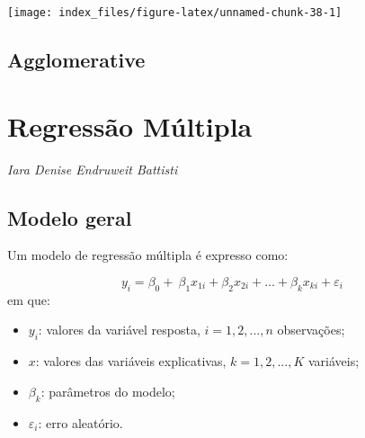 \documentclass[12pt,brazil,oneside]{book}
\newenvironment{Shaded}{\begin{snugshade}}{\end{snugshade}}
\newcommand{\CommentTok}[1]{\textcolor[rgb]{0.56,0.35,0.01}{\textit{#1}}}
\newcommand{\DataTypeTok}[1]{\textcolor[rgb]{0.13,0.29,0.53}{#1}}
\newcommand{\KeywordTok}[1]{\textcolor[rgb]{0.13,0.29,0.53}{\textbf{#1}}}
\newcommand{\NormalTok}[1]{#1}
\newcommand{\OtherTok}[1]{\textcolor[rgb]{0.56,0.35,0.01}{#1}}
\newcommand{\StringTok}[1]{\textcolor[rgb]{0.31,0.60,0.02}{#1}}
\begin{document}
\begin{Shaded}
\end{Shaded}

\begin{center}\texttt{[image: index\_files/figure-latex/unnamed-chunk-38-1]} \end{center}

\hypertarget{agglomerative}{%
\section{Agglomerative}\label{agglomerative}}

\hypertarget{regressao-multipla}{%
\chapter{Regressão Múltipla}\label{regressao-multipla}}

\emph{Iara Denise Endruweit Battisti}

\hypertarget{modelo-geral}{%
\section{Modelo geral}\label{modelo-geral}}

Um modelo de regressão múltipla é expresso como:

\[ 
y_{i} = \beta_0+\ \beta_1x_{1i}+\beta_2x_{2i}+\dots+\beta_kx_{ki}+\varepsilon_i\ 
\]
\noindent
em que:

\begin{itemize}
\item
  \(y_{i}\): valores da variável resposta, \(i = 1, 2,..., n\) observações;
\item
  \(x\): valores das variáveis explicativas, \(k = 1, 2,..., K\) variáveis;
\item
  \(\beta_k\): parâmetros do modelo;
\item
  \(\varepsilon_i\): erro aleatório.
\end{itemize}
\end{document}

